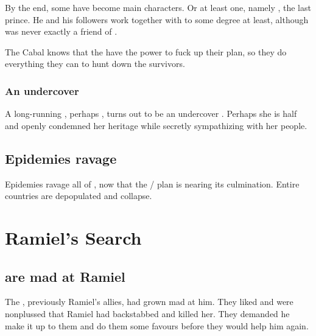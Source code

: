 \begin{garbage}
By the end, some \Kezeradi{} have become main characters. Or at least one, namely \hs{\Sithiyacaan}, the last \Kezeradi{} prince. He and his followers work together with \Ishna\dash to some degree at least, although \Ishnaruchaefir{} was never exactly a friend of \Kezerad. 

The Cabal knows that the \Kezeradi{} have the power to fuck up their plan, so they do everything they can to hunt down the survivors.





\subsubsection{An undercover \Kezeradi}
A long-running \resphan, perhaps \Achsah, turns out to be an undercover \Kezeradi. Perhaps she is half \Kezeradi{} and openly condemned her heritage while secretly sympathizing with her people.









\subsection{Epidemies ravage \Azmith}
Epidemies ravage all of \Azmith, now that the \Iquin/\hs{\Morbus} plan is nearing its culmination. 
Entire countries are depopulated and collapse. 















\section{Ramiel's Search}





\subsection{\Vorcanths{} are mad at Ramiel}
The \hs{\vorcanths}, previously Ramiel's allies, had grown mad at him. 
They liked \Shiaraid{} and were nonplussed that Ramiel had backstabbed and killed her. 
They demanded he make it up to them and do them some favours before they would help him again. 






\end{garbage}
